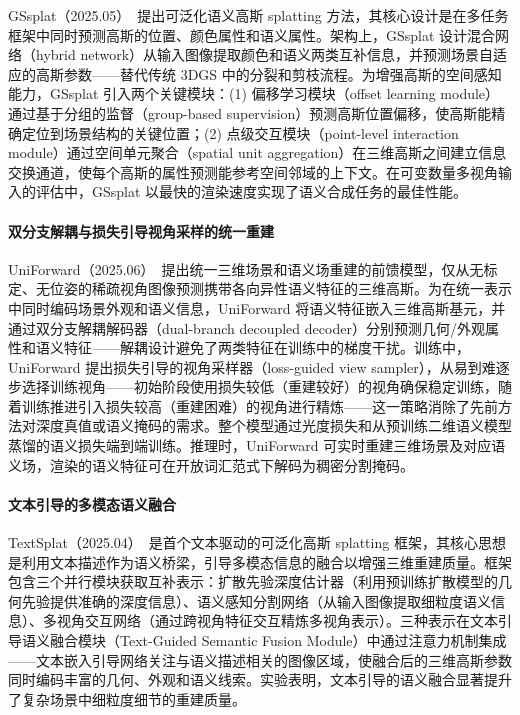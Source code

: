 GSsplat（2025.05）~\cite{2505_04659}提出可泛化语义高斯 splatting 方法，其核心设计是在多任务框架中同时预测高斯的位置、颜色属性和语义属性。架构上，GSsplat 设计混合网络（hybrid network）从输入图像提取颜色和语义两类互补信息，并预测场景自适应的高斯参数——替代传统 3DGS 中的分裂和剪枝流程。为增强高斯的空间感知能力，GSsplat 引入两个关键模块：(1) 偏移学习模块（offset learning module）通过基于分组的监督（group-based supervision）预测高斯位置偏移，使高斯能精确定位到场景结构的关键位置；(2) 点级交互模块（point-level interaction module）通过空间单元聚合（spatial unit aggregation）在三维高斯之间建立信息交换通道，使每个高斯的属性预测能参考空间邻域的上下文。在可变数量多视角输入的评估中，GSsplat 以最快的渲染速度实现了语义合成任务的最佳性能。

\paragraph{双分支解耦与损失引导视角采样的统一重建}

UniForward（2025.06）~\cite{2506_09378}提出统一三维场景和语义场重建的前馈模型，仅从无标定、无位姿的稀疏视角图像预测携带各向异性语义特征的三维高斯。为在统一表示中同时编码场景外观和语义信息，UniForward 将语义特征嵌入三维高斯基元，并通过双分支解耦解码器（dual-branch decoupled decoder）分别预测几何/外观属性和语义特征——解耦设计避免了两类特征在训练中的梯度干扰。训练中，UniForward 提出损失引导的视角采样器（loss-guided view sampler），从易到难逐步选择训练视角——初始阶段使用损失较低（重建较好）的视角确保稳定训练，随着训练推进引入损失较高（重建困难）的视角进行精炼——这一策略消除了先前方法对深度真值或语义掩码的需求。整个模型通过光度损失和从预训练二维语义模型蒸馏的语义损失端到端训练。推理时，UniForward 可实时重建三维场景及对应语义场，渲染的语义特征可在开放词汇范式下解码为稠密分割掩码。

\paragraph{文本引导的多模态语义融合}

TextSplat（2025.04）~\cite{2504_09588}是首个文本驱动的可泛化高斯 splatting 框架，其核心思想是利用文本描述作为语义桥梁，引导多模态信息的融合以增强三维重建质量。框架包含三个并行模块获取互补表示：扩散先验深度估计器（利用预训练扩散模型的几何先验提供准确的深度信息）、语义感知分割网络（从输入图像提取细粒度语义信息）、多视角交互网络（通过跨视角特征交互精炼多视角表示）。三种表示在文本引导语义融合模块（Text-Guided Semantic Fusion Module）中通过注意力机制集成——文本嵌入引导网络关注与语义描述相关的图像区域，使融合后的三维高斯参数同时编码丰富的几何、外观和语义线索。实验表明，文本引导的语义融合显著提升了复杂场景中细粒度细节的重建质量。

